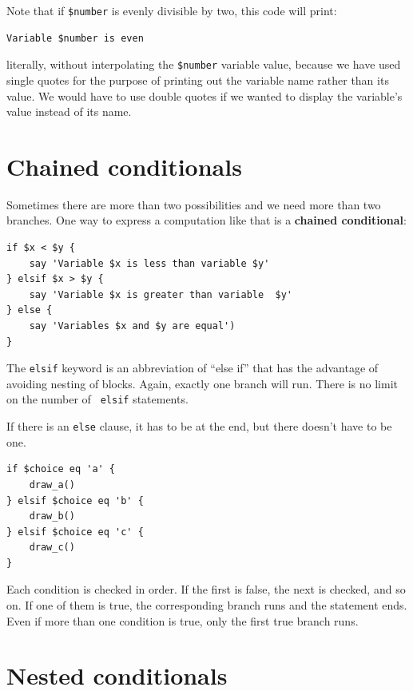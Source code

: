 Note that if \verb'$number' is evenly divisible by two, 
this code will print:

\begin{verbatim} 
Variable $number is even
\end{verbatim}

literally, without interpolating the \verb'$number' variable 
value, because we have used single quotes for the purpose 
of printing out the variable name rather 
than its value. We would have to use double quotes if 
we wanted to display the variable's value instead of its 
name.


\section{Chained conditionals}

Sometimes there are more than two possibilities and we need more than
two branches.  One way to express a computation like that is a 
{\bf chained conditional}:

\begin{verbatim}
if $x < $y {
    say 'Variable $x is less than variable $y'
} elsif $x > $y {
    say 'Variable $x is greater than variable  $y' 
} else {
    say 'Variables $x and $y are equal')
}
\end{verbatim}
%
The {\tt elsif} keyword is an abbreviation of ``else if'' that 
has the advantage of avoiding nesting of blocks. Again, exactly one
branch will run.  There is no limit on the number of {\tt
elsif} statements.  

If there is an {\tt else} clause, it has to be
at the end, but there doesn't have to be one.

\begin{verbatim}
if $choice eq 'a' {
    draw_a()
} elsif $choice eq 'b' {
    draw_b()
} elsif $choice eq 'c' {
    draw_c()
}
\end{verbatim}
%
Each condition is checked in order.  If the first is false,
the next is checked, and so on.  If one of them is
true, the corresponding branch runs and the statement
ends.  Even if more than one condition is true, only the
first true branch runs.  


\section{Nested conditionals}


